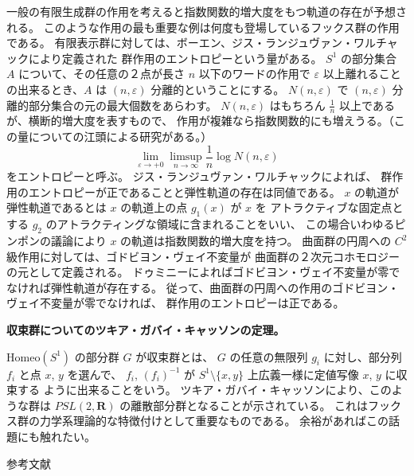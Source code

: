 \documentclass[uplatex,dvipdfmx]{jlreq}
\begin{document}
一般の有限生成群の作用を考えると指数関数的増大度をもつ軌道の存在が予想される。
このような作用の最も重要な例は何度も登場しているフックス群の作用である。
有限表示群に対しては、ボーエン、ジス・ランジュヴァン・ワルチャックにより定義された
群作用のエントロピーという量がある。
$S^1$ の部分集合 $A$ について、その任意の２点が長さ $n$ 以下のワードの作用で
$\varepsilon$ 以上離れることの出来るとき、$A$ は $(n,\varepsilon)$ 分離的ということにする。
$N(n,\varepsilon)$ で $(n,\varepsilon)$ 分離的部分集合の元の最大個数をあらわす。
$N(n,\varepsilon)$ はもちろん $\frac{1}{n}$ 以上であるが、横断的増大度を表すもので、
作用が複雑なら指数関数的にも増えうる。（この量についての江頭による研究がある。）
\[
  \lim_{\varepsilon \to +0} \limsup_{n \to \infty} \frac{1}{n} \log N(n,\varepsilon)
\]
をエントロピーと呼ぶ。
ジス・ランジュヴァン・ワルチャックによれば、
群作用のエントロピーが正であることと弾性軌道の存在は同値である。
$x$ の軌道が弾性軌道であるとは $x$ の軌道上の点 $g_1(x)$ が $x$ を
アトラクティブな固定点とする $g_2$ のアトラクティングな領域に含まれることをいい、
この場合いわゆるピンポンの議論により $x$ の軌道は指数関数的増大度を持つ。
曲面群の円周への $C^2$ 級作用に対しては、ゴドビヨン・ヴェイ不変量が
曲面群の２次元コホモロジーの元として定義される。
ドゥミニーによればゴドビヨン・ヴェイ不変量が零でなければ弾性軌道が存在する。
従って、曲面群の円周への作用のゴドビヨン・ヴェイ不変量が零でなければ、
群作用のエントロピーは正である。

\medskip
\noindent
\textbf{収束群についてのツキア・ガバイ・キャッソンの定理。}

\medskip

$\mathrm{Homeo}(S^1)$ の部分群 $G$ が収束群とは、
$G$ の任意の無限列 $g_i$ に対し、部分列 $f_i$ と点 $x$, $y$ を選んで、
$f_i$, $(f_i)^{-1}$ が $S^1 \setminus \{x, y\}$ 上広義一様に定値写像 $x$, $y$ に収束する
ように出来ることをいう。
ツキア・ガバイ・キャッソンにより、このような群は $PSL(2,\mathbf{R})$ の離散部分群となることが示されている。
これはフックス群の力学系理論的な特徴付けとして重要なものである。
余裕があればこの話題にも触れたい。

\medskip

\begin{center}
  \textsc{参考文献}
\end{center}
\end{document}
